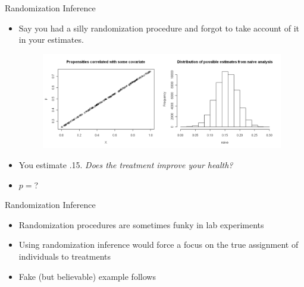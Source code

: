 \documentclass[
  11pt,
  ignorenonframetext,
]{beamer}
\providecommand{\tightlist}{%
  \setlength{\itemsep}{0pt}\setlength{\parskip}{0pt}}\usepackage{longtable,booktabs,array}
\begin{document}
\begin{frame}{Randomization Inference}
\protect\hypertarget{randomization-inference-2}{}
\begin{itemize}
\tightlist
\item
  Say you had a silly randomization procedure and forgot to take account
  of it in your estimates.

  \begin{figure}[htbp]
            \centering
                \includegraphics[width=.9\textwidth]{figs/pw2.png}
            \label{fig:pweight}
        \end{figure}
\item
  You estimate .15. \textsl{Does the treatment improve your health?}
\item
  \(p=\)?
\end{itemize}
\end{frame}

\begin{frame}{Randomization Inference}
\protect\hypertarget{randomization-inference-3}{}
\begin{itemize}
\tightlist
\item
  Randomization procedures are sometimes funky in lab experiments
\item
  Using randomization inference would force a focus on the true
  assignment of individuals to treatments
\item
  Fake (but believable) example follows
\end{itemize}
\end{frame}
\end{document}
